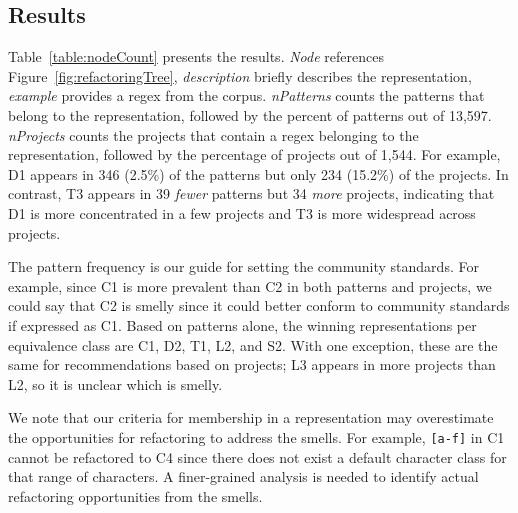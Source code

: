 \subsection{Results}
Table~\ref{table:nodeCount} presents the results.
 \emph{Node}  references  Figure~\ref{fig:refactoringTree}, \emph{description}  briefly describes the representation, \emph{example} provides a regex from the corpus.  \emph{nPatterns}  counts the patterns that belong to the representation, followed by the percent of patterns out of 13,597.
 \emph{nProjects}  counts the projects that contain a regex belonging to the representation,
followed by the percentage of projects out of 1,544.
For example, D1 appears in 346 (2.5\%) of the patterns but only 234 (15.2\%) of the projects.
  In contrast,  T3 appears in 39 \emph{fewer} patterns but 34 \emph{more} projects, indicating that D1 is more concentrated in a few projects and T3 is more widespread across projects.

The pattern frequency is our guide for setting the community standards.
For example, since C1 is more prevalent than C2 in both patterns and projects, we could say that C2 is smelly since it could better conform to community standards if expressed as C1.
Based on patterns alone, the winning representations per equivalence class are C1, D2, T1, L2, and S2. With one exception, these are the same for recommendations based on projects; L3 appears in more projects than L2, so it is unclear which is smelly.

We note that our criteria for membership in a representation may overestimate the opportunities for refactoring to address the smells. For example, \verb![a-f]! in C1 cannot be refactored to C4 since there does not exist a default character class for that range of characters. A finer-grained analysis is needed to identify actual refactoring opportunities from the smells.

